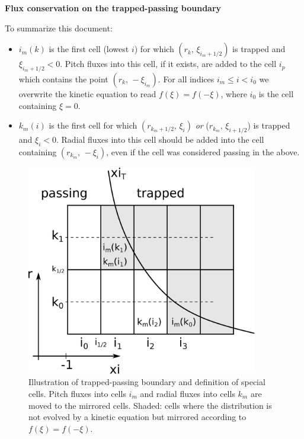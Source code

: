 \documentclass[11pt,a4paper]{article}
\begin{document}
\begin{center}
\Large \bf Flux conservation on the trapped-passing boundary
\end{center}

To summarize this document:
\begin{itemize}
\item $i_m(k)$ is the first cell (lowest $i$) for which $(r_k,\,\xi_{i_m+1/2})$ is trapped and $\xi_{i_m+1/2}<0$. Pitch fluxes into this cell, if it exists, are added to the cell $i_p$ which contains the point $(r_k,\,-\xi_{i_m})$. For all indices $i_m \leq i < i_0$ we overwrite the kinetic equation to read $f(\xi) = f(-\xi)$, where $i_0$ is the cell containing $\xi=0$.
\item $k_m(i)$ is the first cell for which $(r_{k_m+1/2},\,\xi_i)$ \emph{or} ($r_{k_m},\,\xi_{i+1/2}$) is trapped and $\xi_i < 0$. Radial fluxes into this cell should be added into the cell containing $(r_{k_m},\,-\xi_i)$, even if the cell was considered passing in the above.
\end{itemize}

\begin{figure}[hb]
\begin{center}
\includegraphics[width=0.9\textwidth,trim=-10mm 0 10mm 0]{trappedbc_fig}
\caption{Illustration of trapped-passing boundary and definition of special cells. Pitch fluxes into cells $i_m$ and radial fluxes into cells $k_m$ are moved to the mirrored cells. Shaded: cells where the distribution is not evolved by a kinetic equation but mirrored according to $f(\xi) = f(-\xi)$.}
\end{center}
\end{figure}
\end{document}
